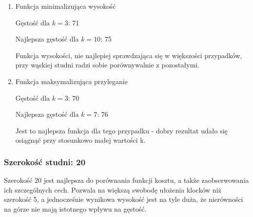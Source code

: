 \documentclass{article}
\begin{document}
\begin{enumerate}
\item Funkcja minimalizująca wysokość

Gęstość dla $k=3$: 71

Najlepsza gęstość dla $k=10$: 75

Funkcja wysokości, nie najlepiej sprawdzająca się w większości przypadków, przy wąskiej studni radzi sobie porównywalnie z pozostałymi.

\item Funkcja maksymalizująca przyleganie

Gęstość dla $k=3$: 70

Najlepsza gęstość dla $k=7$: 76

Jest to najlepsza funkcja dla tego przypadku - dobry rezultat udało się osiągnąć przy stosunkowo małej wartości k.
\end{enumerate}
\subsubsection{Szerokość studni: 20}
Szerokość 20 jest najlepsza do porównania funkcji kosztu, a także zaobserwowania ich szczególnych cech.
Pozwala na większą swobodę ułożenia klocków niż szerokość 5, a jednocześnie wynikowa wysokość jest na tyle duża, że nierówności na górze nie mają istotnego wpływu na gęstość.
\end{document}
